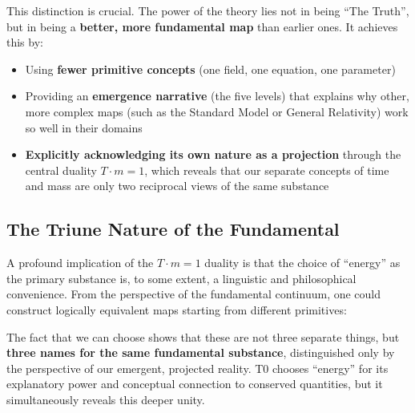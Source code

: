 	This distinction is crucial. The power of the theory lies not in being \enquote{The Truth}, but in being a \textbf{better, more fundamental map} than earlier ones. It achieves this by:
	\begin{itemize}
		\item Using \textbf{fewer primitive concepts} (one field, one equation, one parameter)
		\item Providing an \textbf{emergence narrative} (the five levels) that explains why other, more complex maps (such as the Standard Model or General Relativity) work so well in their domains
		\item \textbf{Explicitly acknowledging its own nature as a projection} through the central duality $T \cdot m = 1$, which reveals that our separate concepts of time and mass are only two reciprocal views of the same substance
	\end{itemize}

	\subsection{The Triune Nature of the Fundamental}

	A profound implication of the $T \cdot m = 1$ duality is that the choice of \enquote{energy} as the primary substance is, to some extent, a linguistic and philosophical convenience. From the perspective of the fundamental continuum, one could construct logically equivalent maps starting from different primitives:

	\begin{center}
	\end{center}

	The fact that we can choose shows that these are not three separate things, but \textbf{three names for the same fundamental substance}, distinguished only by the perspective of our emergent, projected reality. T0 chooses \enquote{energy} for its explanatory power and conceptual connection to conserved quantities, but it simultaneously reveals this deeper unity.

